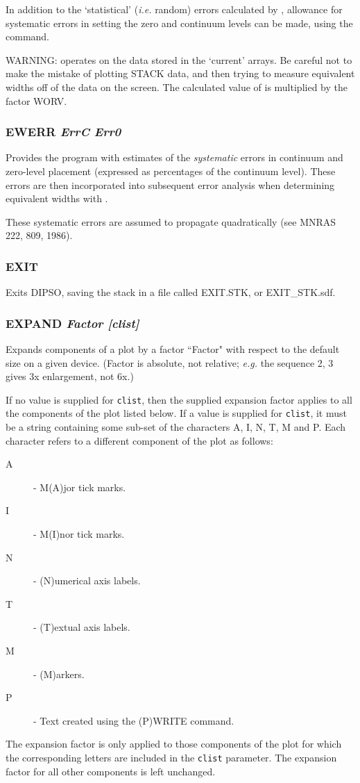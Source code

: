 \documentclass[twoside,11pt,noabs,nolof]{starlink}
\providecommand{\dipcom}[3]{\subsubsection*{\label{COM:#1}\xlabel{COM:#1}\textbf{#1} \emph{#2}}}
\newenvironment{dipdesc}{\begin{description}}{\end{description}}
\providecommand{\dipitem}[2]{ \item[{#1}] {#2} }
\begin{document}
In addition to the `statistical' (\emph{i.e.} random) errors calculated
by ,  allowance for systematic errors in setting the zero and
continuum levels can be made, using the   command.

WARNING:   operates on the data stored in the `current' arrays. Be
careful not to make the mistake of plotting STACK data, and then
trying to measure equivalent widths off of the data on the screen. The
calculated value of   is multiplied by the factor WORV.

\dipcom{EWERR}{ErrC Err0}{Estimates the systematic errors in continuum and zero-level values}
Provides the program with estimates of the \emph{systematic} errors in
continuum and zero-level placement (expressed as percentages of the
continuum level). These errors are then incorporated into subsequent
error analysis when determining equivalent widths with .

These systematic errors are assumed to propagate quadratically (see
MNRAS 222, 809, 1986).

\dipcom{EXIT}{}{Exits DIPSO, saving the stack in a binary file}
Exits DIPSO, saving the stack in a file called EXIT.STK, or EXIT\_STK.sdf.

\dipcom{EXPAND}{Factor [clist]}{Changes the sizes of individual components of a plot}
Expands components of a plot by a factor ``Factor" with respect to the default
size on a given device. (Factor is absolute, not relative; \emph{e.g.} the
sequence   2,   3 gives 3x enlargement, not 6x.)

If no value is supplied for {\texttt{clist}},  then the supplied expansion factor
applies to all the components of the plot listed below. If a value is supplied
for {\texttt{clist}},  it must be a string containing some sub-set of the characters
A, I, N, T, M and P. Each character refers to a different component of the plot
as follows:

\begin{dipdesc}
\dipitem{A}{ - M(A)jor tick marks.}
\dipitem{I}{ - M(I)nor tick marks.}
\dipitem{N}{ - (N)umerical axis labels.}
\dipitem{T}{ - (T)extual axis labels.}
\dipitem{M}{ - (M)arkers.}
\dipitem{P}{ - Text created using the (P)WRITE command.}
\end{dipdesc}

The expansion factor is only applied to those components of the plot for which
the corresponding letters are included in the {\texttt{clist}}  parameter. The
expansion factor for all other components is left unchanged.
\end{document}

